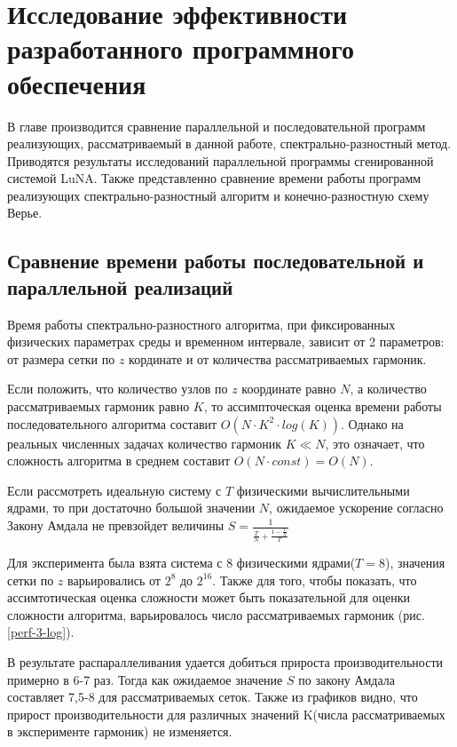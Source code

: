 \section{Исследование эффективности разработанного программного обеспечения}

В главе производится сравнение параллельной и последовательной программ реализующих,
рассматриваемый в данной работе, спектрально-разностный метод.
Приводятся результаты исследований параллельной программы сгенированной системой LuNA.
Также представленно сравнение времени работы программ реализующих спектрально-разностный алгоритм
и конечно-разностную схему Верье.

\subsection{Сравнение времени работы последовательной и параллельной реализаций}

Время работы спектрально-разностного алгоритма, при фиксированных физических параметрах среды и временном интервале,
зависит от 2 параметров: от размера сетки по $z$ кординате и от количества рассматриваемых гармоник.

Если положить, что количество узлов по $z$ координате равно $N$, а количество рассматриваемых гармоник равно $K$,
то ассимпточеская оценка времени работы последовательного алгоритма составит $O(N\cdot K^2 \cdot log(K))$. Однако на реальных численных задачах
количество гармоник $K \ll N$, это означает, что сложность алгоритма в среднем составит $O(N \cdot const)=O(N)$.

Если рассмотреть идеальную систему с $T$ физическими вычислительными ядрами, то при достаточно большой значении $N$,
ожидаемое ускорение согласно Закону Амдала не превзойдет величины $S = \frac{1}{\frac{T}{N} + \frac{1-\frac{T}{N}}{T}}$

Для эксперимента была взята система с 8 физическими ядрами($T=8$), значения сетки по $z$ варьировались от $2^8$ до $2^{16}$.
Также для того, чтобы показать, что ассимтотическая оценка сложности может быть показательной для оценки сложности алгоритма,
варьировалось число рассматриваемых гармоник (рис. \ref{perf-3-log}).


В результате распараллеливания удается добиться прироста производительности примерно в 6-7 раз. Тогда как
ожидаемое значение $S$ по закону Амдала составляет 7,5-8 для рассматриваемых сеток. Также из графиков видно, что прирост
производительности для различных значений K(числа рассматриваемых в эксперименте гармоник) не изменяется.

